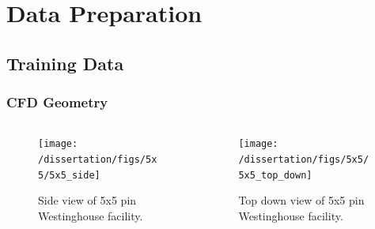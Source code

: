 \documentclass[t, pdftex]{beamer}
\begin{document}
\section[Preprocessing]{Data Preparation}
\subsection*{Training Data}
\begin{frame}
\frametitle{CFD Geometry}
\vspace*{-32pt}
\begin{columns}
    \begin{column}{0.5\textwidth}
\begin{figure}[H]
    \centering
    \texttt{[image: /dissertation/figs/5x5/5x5\_side]}
    \caption{\centering Side view of 5x5 pin \\ Westinghouse facility.}
    \label{fig:5x5side}
\end{figure}
    \end{column}
\begin{column}{0.5\textwidth}
\begin{figure}[H]
    \centering
    \texttt{[image: /dissertation/figs/5x5/5x5\_top\_down]}
    \caption{\centering Top down view of 5x5 pin \\ Westinghouse facility.}
    \label{fig:5x5topdown}
\end{figure}
\end{column}
\end{columns}
\cite{salko17}
\end{frame}

\end{document}
